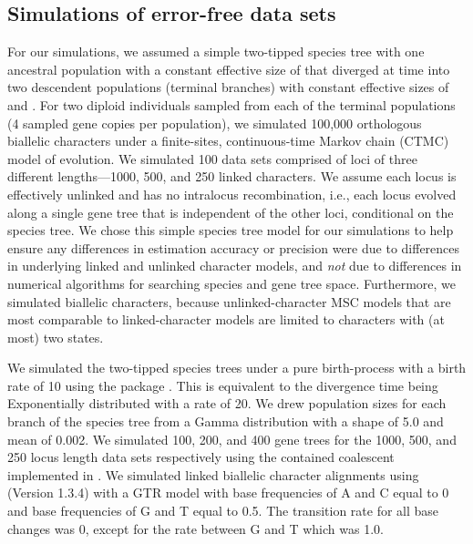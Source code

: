 \subsection{Simulations of error-free data sets}
For our simulations, we assumed a simple two-tipped species tree
with one ancestral population with a constant effective size
of
\rootpopsize
that diverged at time \divtime into
two descendent populations (terminal branches) with constant
effective sizes of
\tippopsize[1]
and
\tippopsize[2]
.
For two diploid individuals sampled from each of the terminal
populations (4 sampled gene copies per population),
we simulated 100,000 orthologous biallelic characters under a finite-sites,
continuous-time Markov chain (CTMC) model of evolution.
We simulated 100 data sets comprised of loci of three different lengths---1000,
500, and 250 linked characters.
We assume each locus is effectively unlinked and has no intralocus
recombination, i.e., each locus evolved along a single gene tree that is
independent of the other loci, conditional on the species tree.
We chose this simple species tree model for our simulations to help ensure any
differences in estimation accuracy or precision were due to differences in
underlying linked and unlinked character models,
and \emph{not} due to differences in numerical algorithms for searching species
and gene tree space.
Furthermore, we simulated biallelic characters, because unlinked-character MSC
models
\citep{bryantInferringSpeciesTrees2012,Oaks2018ecoevolity}
that are most comparable to linked-character models
\citep{Heled2010,ogilvieStarBEAST2BringsFaster2017}
are limited to characters with (at most) two states.

We simulated the two-tipped species trees under a pure birth-process with a
birth rate of 10 using the \python package
\dendropy
\citep[Version 4.40;  branch commit eb69003;][]{Dendropy}.  
This is equivalent to the divergence time being Exponentially distributed with
a rate of 20.
We drew population sizes for each branch of the species tree from a Gamma 
distribution with a shape of 5.0 and mean of 0.002. We simulated 100, 200, and 
400 gene trees for the 1000, 500, and 250 locus length data sets respectively 
using the contained coalescent implemented in \dendropy.
We simulated linked biallelic character alignments using
\seqgen (Version 1.3.4)
\citep{rambautSeqGenApplicationMonte1997}
with a GTR model with base frequencies of A and C equal to 0 and base 
frequencies of G and T equal to 0.5. The transition rate for all base changes was 
0, except for the rate between G and T which was 1.0. 


